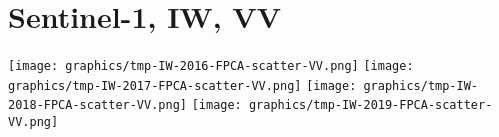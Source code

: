 
\section{Sentinel-1, IW, VV}
\setcounter{theorem}{0}

\renewcommand{\theenumi}{\roman{enumi}}
\renewcommand{\labelenumi}{\textnormal{(\theenumi)}$\;\;$}


\begin{center}
\begin{minipage}{7.0in}
\texttt{[image: graphics/tmp-IW-2016-FPCA-scatter-VV.png]}
\quad
\texttt{[image: graphics/tmp-IW-2017-FPCA-scatter-VV.png]}
\vskip 0.5cm
\texttt{[image: graphics/tmp-IW-2018-FPCA-scatter-VV.png]}
\quad
\texttt{[image: graphics/tmp-IW-2019-FPCA-scatter-VV.png]}
\end{minipage}
\end{center}


\renewcommand{\theenumi}{\roman{enumi}}
\renewcommand{\labelenumi}{\textnormal{(\theenumi)}$\;\;$}

